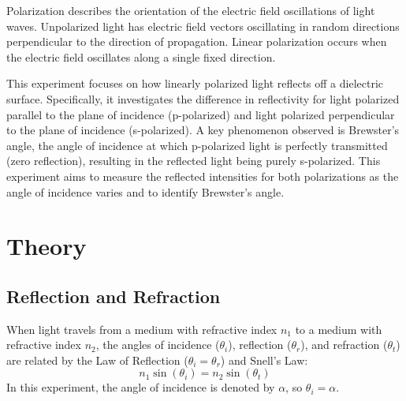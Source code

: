 \documentclass[journal]{IEEEtran}
\begin{document}
Polarization describes the orientation of the electric field oscillations of light waves. Unpolarized light has electric field vectors oscillating in random directions perpendicular to the direction of propagation. Linear polarization occurs when the electric field oscillates along a single fixed direction.

This experiment focuses on how linearly polarized light reflects off a dielectric surface. Specifically, it investigates the difference in reflectivity for light polarized parallel to the plane of incidence (p-polarized) and light polarized perpendicular to the plane of incidence (s-polarized). A key phenomenon observed is Brewster's angle, the angle of incidence at which p-polarized light is perfectly transmitted (zero reflection), resulting in the reflected light being purely s-polarized. This experiment aims to measure the reflected intensities for both polarizations as the angle of incidence varies and to identify Brewster's angle.
\section{Theory}
\subsection{Reflection and Refraction}
When light travels from a medium with refractive index $n_1$ to a medium with refractive index $n_2$, the angles of incidence ($\theta_i$), reflection ($\theta_r$), and refraction ($\theta_t$) are related by the Law of Reflection ($\theta_i = \theta_r$) and Snell's Law:
\begin{equation}
    n_1 \sin(\theta_i) = n_2 \sin(\theta_t)
\end{equation}
In this experiment, the angle of incidence is denoted by $\alpha$, so $\theta_i = \alpha$.
\end{document}
